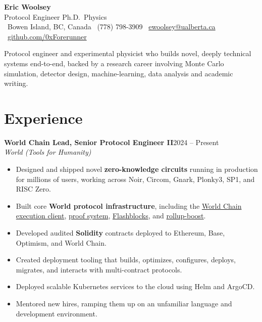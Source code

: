 \documentclass[11pt,letterpaper]{article}
\newcommand{\entry}[4]{%
  \textbf{#1}\hfill{\color{muted}#2}\\
  {\color{muted}\itshape #3}\hfill{\color{muted}\small #4}\par\vspace{1pt}}
\newcommand{\link}[2]{\href{#1}{\color{accent}#2}}
\begin{document}
\begin{center}
  {\fontsize{26}{30}\selectfont\bfseries\color{accent} Eric Woolsey}\\[3pt]
  {\large\color{muted} Protocol Engineer \enspace\textbar\enspace Ph.D.\ Physics}\\[5pt]
  \small
  \faMapMarker*\ Bowen Island, BC, Canada \quad
  \faPhone*\ (778) 798-3909 \quad
  \faEnvelope\ \href{mailto:ewoolsey@ualberta.ca}{ewoolsey@ualberta.ca} \quad
  \faGithub\ \href{https://github.com/0xForerunner}{github.com/0xForerunner}
\end{center}

\vspace{-2pt}
Protocol engineer and experimental physicist who builds novel, deeply technical systems end-to-end,
backed by a research career involving Monte Carlo simulation, detector design, machine-learning, data analysis and academic writing.

\section{Experience}

\entry{World Chain Lead, Senior Protocol Engineer II}{2024 -- Present}{World (Tools for Humanity)}{}
\begin{itemize}
  \item Designed and shipped novel \textbf{zero-knowledge circuits} running in production for millions of users,
        working across Noir, Circom, Gnark, Plonky3, SP1, and RISC Zero.
  \item Built core \textbf{World protocol infrastructure}, including the \link{https://github.com/worldcoin/world-chain}{World Chain execution client},
        \link{https://github.com/worldcoin/world-chain/tree/main/proofs}{proof system},
        \link{https://blog.woolsey.dev/blog/p2p-flashblocks/}{Flashblocks}, and
        \link{https://github.com/flashbots/rollup-boost}{rollup-boost}.
  \item Developed audited \textbf{Solidity} contracts deployed to Ethereum, Base, Optimism, and World Chain.
  \item Created deployment tooling that builds, optimizes, configures, deploys, migrates, and interacts with
        multi-contract protocols.
  \item Deployed scalable Kubernetes services to the cloud using Helm and ArgoCD.
  \item Mentored new hires, ramping them up on an unfamiliar language and development environment.
\end{itemize}
\end{document}
